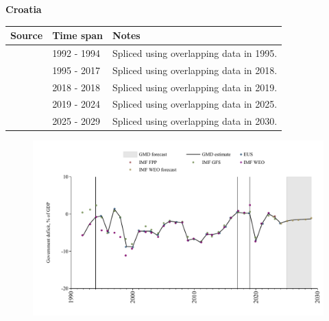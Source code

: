 \documentclass[12pt,a4paper,landscape]{article}
\begin{document}
\begin{adjustbox}{max totalsize={\paperwidth}{\paperheight},center}
\begin{minipage}[t][\textheight][t]{\textwidth}
\vspace*{0.5cm}
{}
\begin{center}
{\Large\bfseries Croatia}
\end{center}
\vspace{0.5cm}
\begin{table}[H]
\centering
\small
\begin{tabular}{|l|l|l|}
\hline
\textbf{Source} & \textbf{Time span} & \textbf{Notes} \\
\hline
\rowcolor{white}\cite{IMF_WEO}& 1992 - 1994 &Spliced using overlapping data in 1995.\\
\rowcolor{lightgray}\cite{EUS}& 1995 - 2017 &Spliced using overlapping data in 2018.\\
\rowcolor{white}\cite{IMF_WEO}& 2018 - 2018 &Spliced using overlapping data in 2019.\\
\rowcolor{lightgray}\cite{EUS}& 2019 - 2024 &Spliced using overlapping data in 2025.\\
\rowcolor{white}\cite{IMF_WEO_forecast}& 2025 - 2029 &Spliced using overlapping data in 2030.\\
\hline
\end{tabular}
\end{table}
\begin{figure}[H]
\centering
\includegraphics[width=\textwidth,height=0.6\textheight,keepaspectratio]{graphs/HRV_govdef_GDP.pdf}
\end{figure}
\end{minipage}
\end{adjustbox}
\end{document}
